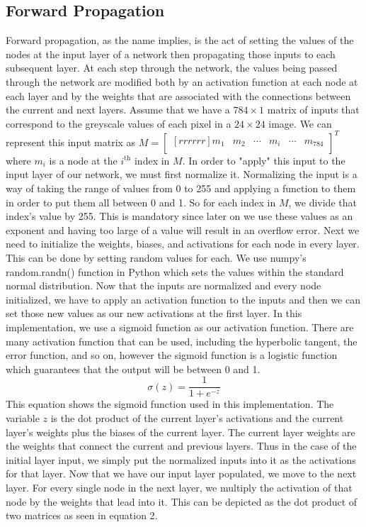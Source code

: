\documentclass[12pt]{article}
\theoremstyle{definition}
\theoremstyle{plain}
\begin{document}
\subsection{Forward Propagation}
Forward propagation, as the name implies, is the act of setting the values of the nodes at the input layer of a network then propagating those inputs to each subsequent layer. At each step through the network, the values being passed through the network are modified both by an activation function at each node at each layer and by the weights that are associated with the connections between the current and next layers. Assume that we have a $784\times 1$ matrix of inputs that correspond to the greyscale values of each pixel in a $24\times 24$ image. We can represent this input matrix as $M = \begin{bmatrix}[rrrrrr]m_1&m_2&\cdots&m_i&\cdots&m_{784}\\\end{bmatrix}^T$ where $m_i$ is a node at the $i^{\mathrm{th}}$ index in $M$. In order to "apply" this input to the input layer of our network, we must first normalize it. Normalizing the input is a way of taking the range of values from 0 to 255 and applying a function to them in order to put them all between 0 and 1. So for each index in $M$, we divide that index's value by 255. This is mandatory since later on we use these values as an exponent and having too large of a value will result in an overflow error. Next we need to initialize the weights, biases, and activations for each node in every layer. This can be done by setting random values for each. We use numpy's random.randn() function in Python which sets the values within the standard normal distribution. Now that the inputs are normalized and every node initialized, we have to apply an activation function to the inputs and then we can set those new values as our new activations at the first layer. In this implementation, we use a sigmoid function as our activation function. There are many activation function that can be used, including the hyperbolic tangent, the error function, and so on, however the sigmoid function is a logistic function which guarantees that the output will be between 0 and 1.
\begin{equation}\label{eqn:Sigmoid}
\sigma(z) = \dfrac{1}{1+e^{-z}}
\end{equation}
This equation shows the sigmoid function used in this implementation. The variable $z$ is the dot product of the current layer's activations and the current layer's weights plus the biases of the current layer. The current layer weights are the weights that connect the current and previous layers. Thus in the case of the initial layer input, we simply put the normalized inputs into it as the activations for that layer. Now that we have our input layer populated, we move to the next layer. For every single node in the next layer, we multiply the activation of that node by the weights that lead into it. This can be depicted as the dot product of two matrices as seen in equation 2\cite{nielsen_2017}.
\end{document}

